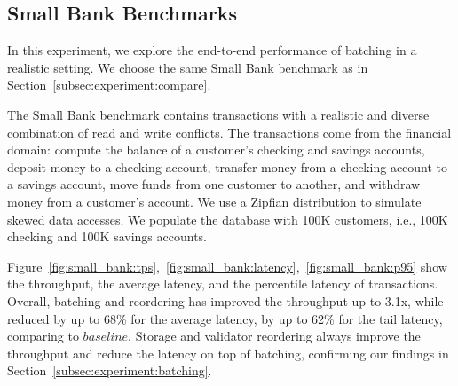 \subsection{Small Bank Benchmarks}
\label{subsec:experiment:end2end}

In this experiment, we explore the end-to-end performance of batching in a realistic setting. We choose the same Small Bank benchmark as in Section~\ref{subsec:experiment:compare}.

The Small Bank benchmark contains transactions with a realistic and diverse
combination of read and write conflicts. The transactions come from the
financial domain: compute the balance of a customer's checking and savings
accounts, deposit money to a checking account, transfer money from a checking
account to a savings account, move funds from one customer to another, and withdraw money from a customer's account. We use a Zipfian distribution to simulate skewed data accesses. We populate the database with 100K customers, i.e., 100K checking and 100K savings accounts.


Figure~\ref{fig:small_bank:tps},~\ref{fig:small_bank:latency},~\ref{fig:small_bank:p95} show the throughput, the average latency, and the percentile latency of transactions. Overall, batching and reordering has improved the throughput up to 3.1x, while reduced by up to 68\% for the average latency, by up to 62\% for the tail latency, comparing to $baseline$. Storage and validator reordering always improve the throughput and reduce the latency on top of batching, confirming our findings in Section~\ref{subsec:experiment:batching}.

